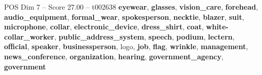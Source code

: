 \begin{textsample}{POS Dim 7 – Score 27.00 – t002638}  \label{ex:f7_pos_036}
\textbf{eyewear}, \textbf{glasses}, \textbf{vision\_care}, \textbf{forehead}, \textbf{audio\_equipment}, \textbf{formal\_wear}, \textbf{spokesperson}, \textbf{necktie}, \textbf{blazer}, \textbf{suit}, \textbf{microphone}, \textbf{collar}, \textbf{electronic\_device}, \textbf{dress\_shirt}, \textbf{coat}, \textbf{white-collar\_worker}, \textbf{public\_address\_system}, \textbf{speech}, \textbf{podium}, \textbf{lectern}, \textbf{official}, \textbf{speaker}, \textbf{businessperson}, logo, \textbf{job}, \textbf{flag}, \textbf{wrinkle}, \textbf{management}, \textbf{news\_conference}, \textbf{organization}, \textbf{hearing}, \textbf{government\_agency}, \textbf{government}

\end{textsample}
